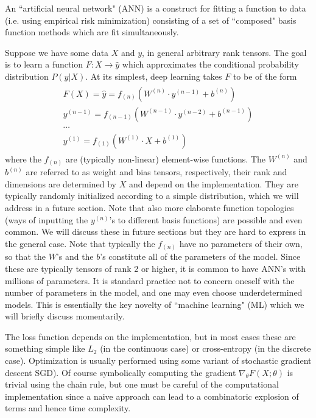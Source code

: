 \documentclass{subfile}
\begin{document}
An ``artificial neural network" (ANN) is a construct for fitting a function to data (i.e. using empirical risk minimization) consisting of a set of ``composed"
basis function methods which are fit simultaneously.

Suppose we have some data $X$ and $y$, in general arbitrary rank tensors.  The goal is to learn a function $F: X\to \hat{y}$ which approximates the conditional
probability distribution $P(y|X)$.  At its simplest,
deep learning takes $F$ to be of the form
\begin{align}
\begin{split}
    F(X) = \hat{y} = f_{(n)}(W^{(n)}\cdot y^{(n-1)}+b^{(n)}) \\
    y^{(n-1)} = f_{(n-1)}(W^{(n-1)}\cdot y^{(n-2)}+b^{(n-1)}) \\
    \cdots \\
    y^{(1)} = f_{(1)}(W^{(1)}\cdot X+b^{(1)})
\end{split}
\end{align}
where the $f_{(n)}$ are (typically non-linear) element-wise functions.  The $W^{(n)}$ and $b^{(n)}$ are referred to as weight and bias tensors, respectively,
their rank and dimensions are determined by $X$ and depend on the implementation.  They are typically randomly initialized according to a simple distribution,
which we will address in a future section.  Note that also more elaborate function topologies (ways of inputting the $y^{(n)}$'s to different basis functions)
are possible and even common.  We will discuss these in future sections but they are hard to express in the general case.  Note that typically the $f_{(n)}$
have no parameters of their own, so that the $W$'s and the $b$'s constitute all of the parameters of the model.  Since these are typically tensors of rank 2 or
higher, it is common to have ANN's with millions of parameters.  It is standard practice not to concern oneself with the number of parameters in the model, and
one may even choose underdetermined models.  This is essentially the key novelty of ``machine learning" (ML) which we will briefly discuss momentarily.

The loss function depends on the implementation, but in most cases these are something simple like $L_{2}$ (in the continuous case) or cross-entropy (in the
discrete case).  Optimization is usually performed using some variant of stochastic gradient descent SGD).  Of course symbolically computing the gradient
$\nabla_{\theta}F(X;\theta)$ is trivial using the chain rule, but one must be careful of the computational implementation since a naive approach can lead to a
combinatoric explosion of terms and hence time complexity.
\end{document}
